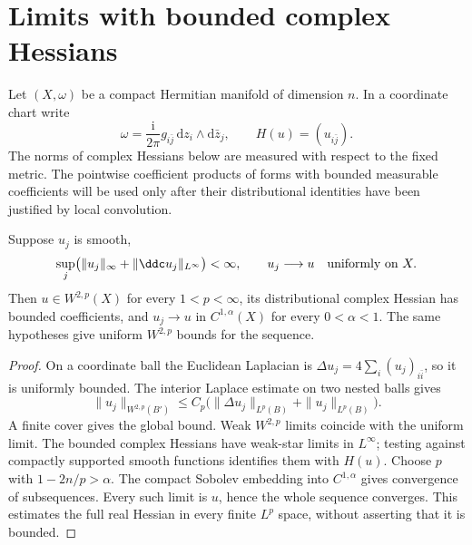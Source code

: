 \section{Limits with bounded complex Hessians}

Let $(X,\omega)$ be a compact Hermitian manifold of dimension $n$.
In a coordinate chart write
\[
 \omega=\frac{\mathrm i}{2\pi}g_{i\bar j}\,
                 \mathrm dz_i\wedge\mathrm d\bar z_j,
 \qquad H(u)=(u_{i\bar j}).
\]
The norms of complex Hessians below are measured with respect to the fixed
metric. The pointwise coefficient products of forms with bounded measurable
coefficients will be used only after their distributional identities have
been justified by local convolution.

\begin{lemma}\label{draft:603-complex-hessian-compactness}
Suppose $u_j$ is smooth,
\[
 \sup_j\bigl(\|u_j\|_\infty+\|\ddc u_j\|_{L^\infty}\bigr)<\infty,
 \qquad u_j\longrightarrow u\quad\hbox{uniformly on }X.
\]
Then $u\in W^{2,p}(X)$ for every $1<p<\infty$, its distributional complex
Hessian has bounded coefficients, and $u_j\to u$ in $C^{1,\alpha}(X)$
for every $0<\alpha<1$. The same hypotheses give uniform $W^{2,p}$ bounds
for the sequence.
\end{lemma}
\begin{proof}
On a coordinate ball the Euclidean Laplacian is
$\Delta u_j=4\sum_i (u_j)_{i\bar i}$, so it is uniformly bounded.
The interior Laplace estimate on two nested balls gives
\[
 \|u_j\|_{W^{2,p}(B')}\leq C_p
       \bigl(\|\Delta u_j\|_{L^p(B)}+\|u_j\|_{L^p(B)}\bigr).
\]
A finite cover gives the global bound. Weak $W^{2,p}$ limits coincide
with the uniform limit. The bounded complex Hessians have weak-star
limits in $L^\infty$; testing against compactly supported smooth functions
identifies them with $H(u)$. Choose $p$ with $1-2n/p>\alpha$.
The compact Sobolev embedding into $C^{1,\alpha}$ gives convergence of
subsequences. Every such limit is $u$, hence the whole sequence converges.
This estimates the full real Hessian in every finite $L^p$ space, without
asserting that it is bounded.
\end{proof}

